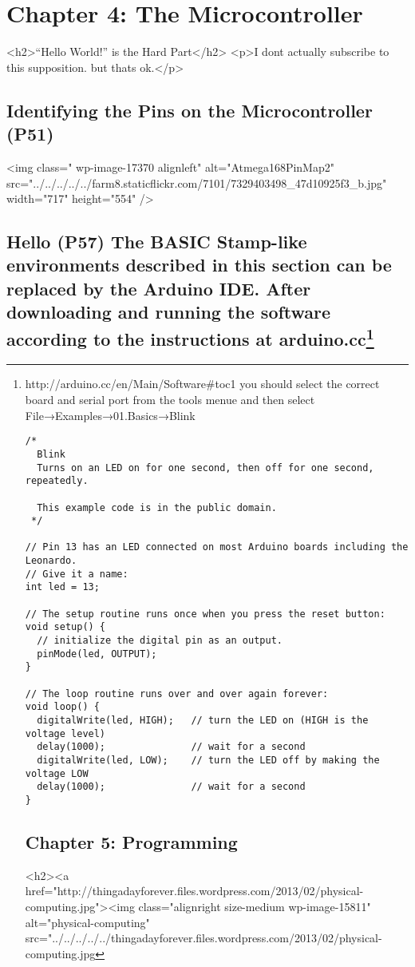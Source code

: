 \documentclass{report}
\begin{document}
\chapter{Chapter 4: The Microcontroller}
<h2>``Hello World!'' is the Hard Part</h2>
<p>I dont actually subscribe to this supposition. but thats ok.</p>

\section{Identifying the Pins on the Microcontroller (P51)}

<img class=" wp-image-17370 alignleft" alt="Atmega168PinMap2" src="../../../../../farm8.staticflickr.com/7101/7329403498_47d10925f3_b.jpg" width="717" height="554" />

\section{Hello (P57)
The BASIC Stamp-like environments described in this section can be replaced by the Arduino IDE. After downloading and running the software according to the instructions at arduino.cc\footnote{http://arduino.cc/en/Main/Software#toc1 you should select the correct board and serial port from the tools menue and then select
File→Examples→01.Basics→Blink

\begin{verbatim}
/*
  Blink
  Turns on an LED on for one second, then off for one second, repeatedly.

  This example code is in the public domain.
 */

// Pin 13 has an LED connected on most Arduino boards including the Leonardo.
// Give it a name:
int led = 13;

// The setup routine runs once when you press the reset button:
void setup() {                
  // initialize the digital pin as an output.
  pinMode(led, OUTPUT);
}

// The loop routine runs over and over again forever:
void loop() {
  digitalWrite(led, HIGH);   // turn the LED on (HIGH is the voltage level)
  delay(1000);               // wait for a second
  digitalWrite(led, LOW);    // turn the LED off by making the voltage LOW
  delay(1000);               // wait for a second
}
\end{verbatim}

\chapter{Chapter 5: Programming}
<h2><a href="http://thingadayforever.files.wordpress.com/2013/02/physical-computing.jpg"><img class="alignright size-medium wp-image-15811" alt="physical-computing" src="../../../../../thingadayforever.files.wordpress.com/2013/02/physical-computing.jpg%

}}
\end{document}
